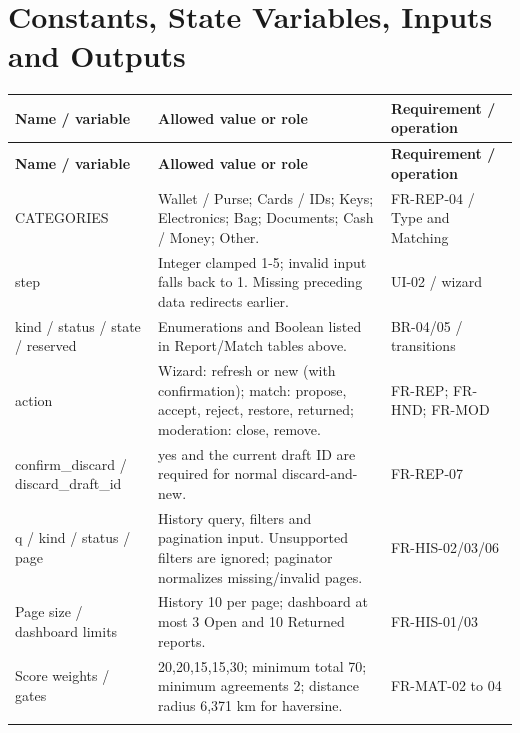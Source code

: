 \documentclass[12pt,a4paper,oneside]{report}
\begin{document}
\section{Constants, State Variables, Inputs and Outputs}

\begin{longtable}{@{}P{0.27\dimexpr\textwidth-24pt\relax}P{0.4\dimexpr\textwidth-24pt\relax}P{0.33\dimexpr\textwidth-24pt\relax}@{}}

\toprule \textbf{Name / variable} & \textbf{Allowed value or role} & \textbf{Requirement / operation} \\ \midrule\endfirsthead

\toprule \textbf{Name / variable} & \textbf{Allowed value or role} & \textbf{Requirement / operation} \\ \midrule\endhead

\bottomrule\endfoot

CATEGORIES & Wallet / Purse; Cards / IDs; Keys; Electronics; Bag; Documents; Cash / Money; Other. & FR-REP-04 / Type and Matching \\ \addlinespace[3pt]

step & Integer clamped 1-5; invalid input falls back to 1. Missing preceding data redirects earlier. & UI-02 / wizard \\ \addlinespace[3pt]

kind / status / state / reserved & Enumerations and Boolean listed in Report/Match tables above. & BR-04/05 / transitions \\ \addlinespace[3pt]

action & Wizard: refresh or new (with confirmation); match: propose, accept, reject, restore, returned; moderation: close, remove. & FR-REP; FR-HND; FR-MOD \\ \addlinespace[3pt]

confirm\_discard / discard\_draft\_id & yes and the current draft ID are required for normal discard-and-new. & FR-REP-07 \\ \addlinespace[3pt]

q / kind / status / page & History query, filters and pagination input. Unsupported filters are ignored; paginator normalizes missing/invalid pages. & FR-HIS-02/03/06 \\ \addlinespace[3pt]

Page size / dashboard limits & History 10 per page; dashboard at most 3 Open and 10 Returned reports. & FR-HIS-01/03 \\ \addlinespace[3pt]

Score weights / gates & 20,20,15,15,30; minimum total 70; minimum agreements 2; distance radius 6,371 km for haversine. & FR-MAT-02 to 04 \\ \addlinespace[3pt]


\end{longtable}
\end{document}
